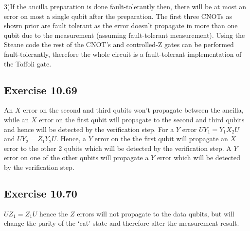 \documentclass[a4paper,12pt]{article}
\begin{document}
3)If the ancilla preparation is done fault-tolerantly then, there will be at most an error
on most a single qubit after the preparation. The first three CNOTs as shown prior are 
fault tolerant as the error doesn't propagate in more than one qubit due to the measurement
(assuming fault-tolerant measurement).
Using the Steane code the rest of the CNOT's and controlled-Z gates can be performed 
fault-tolerantly, therefore the whole circuit is a fault-tolerant implementation of the
Toffoli gate.
\subsection*{Exercise 10.69}
An $X$ error on the second and third qubits won't propagate between the ancilla, while an
$X$ error on the first qubit will propagate to the second and third qubits and hence will be
detected by the verification step. For a $Y$ error $UY_1=Y_1X_2U$ and $UY_2=Z_1Y_2U$. Hence,
a $Y$ error on the the first qubit will propagate an $X$ error to the other 2 qubits which 
will be detected by the verification step. A $Y$ error on one of the other qubits will propagate
a $Y$ error which will be detected by the verification step.
\subsection*{Exercise 10.70}
$UZ_1=Z_1U$ hence the $Z$ errors will not propagate to the data qubits, but will change
the parity of the `cat' state and therefore alter the measurement result.
\end{document}

